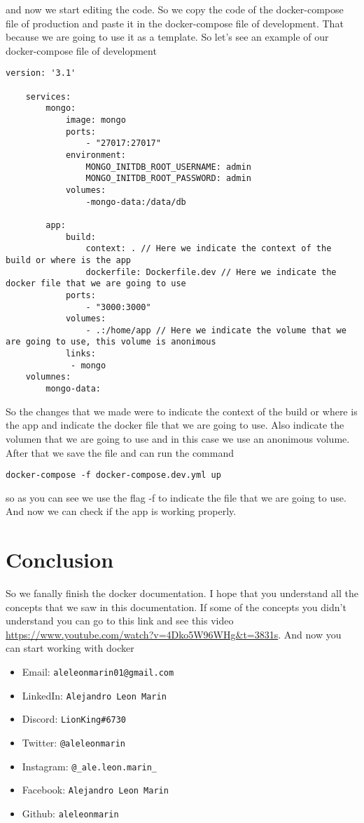 \documentclass{article}
\begin{document}
and now we start editing the code. So we copy the code of the docker-compose file of production and paste it 
in the docker-compose file of development. That because we are going to use it as a template. So let's see an example of our 
docker-compose file of development
\begin{lstlisting}[breaklines=true, breakatwhitespace=true]
    version: '3.1' 

    services: 
        mongo: 
            image: mongo 
            ports:
                - "27017:27017"
            environment: 
                MONGO_INITDB_ROOT_USERNAME: admin
                MONGO_INITDB_ROOT_PASSWORD: admin
            volumes: 
                -mongo-data:/data/db 
         
        app:
            build: 
                context: . // Here we indicate the context of the build or where is the app 
                dockerfile: Dockerfile.dev // Here we indicate the docker file that we are going to use
            ports:
                - "3000:3000"
            volumes: 
                - .:/home/app // Here we indicate the volume that we are going to use, this volume is anonimous
            links: 
             - mongo
    volumnes: 
        mongo-data:
\end{lstlisting}
 
So the changes that we made were to indicate the context of the build or where is the app and indicate the docker file that we are going to use. Also indicate the volumen 
that we are going to use and in this case we use an anonimous volume. After that we save the file and can run the command 
\begin{lstlisting}[breaklines=true, breakatwhitespace=true]
    docker-compose -f docker-compose.dev.yml up
\end{lstlisting}

so as you can see we use the flag -f to indicate the file that we are going to use. And now we can check if the app is working properly. 

\section*{Conclusion}

So we fanally finish the docker documentation. I hope that you understand all the concepts that we saw in this documentation. If some of the concepts you didn't 
understand you can go to this link and see this video \url{https://www.youtube.com/watch?v=4Dko5W96WHg&t=3831s}. And now you can start working with docker 

\begin{itemize}
    \item Email: \texttt{aleleonmarin01@gmail.com}
    \item LinkedIn: \texttt{Alejandro Leon Marin}
    \item Discord: \texttt{LionKing\#6730}
    \item Twitter: \texttt{@aleleonmarin}
    \item Instagram: \texttt{@\_ale.leon.marin\_}
    \item Facebook: \texttt{Alejandro Leon Marin}
    \item Github: \texttt{aleleonmarin}
\end{itemize}
\end{document}
